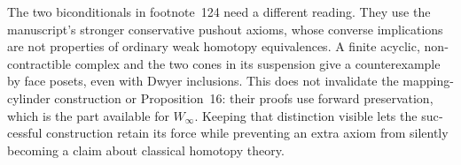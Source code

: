 \begin{otherlanguage}{english}
The two biconditionals in footnote~124 need a different reading. They use the manuscript's stronger conservative pushout axioms, whose converse implications are not properties of ordinary weak homotopy equivalences. A finite acyclic, noncontractible complex and the two cones in its suspension give a counterexample by face posets, even with Dwyer inclusions. This does not invalidate the mapping-cylinder construction or Proposition~16: their proofs use forward preservation, which is the part available for $W_\infty$. Keeping that distinction visible lets the successful construction retain its force while preventing an extra axiom from silently becoming a claim about classical homotopy theory.
\end{otherlanguage}
\dgrchunkend
